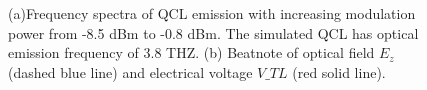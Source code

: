 \documentclass[11pt,final]{scrbook}
\begin{document}
\begin{figure}[htbp]
  \centering
\caption{(a)Frequency spectra of QCL emission with increasing modulation power from -8.5 dBm to -0.8 dBm. The simulated QCL has optical emission frequency of 3.8 THZ. (b) Beatnote of optical field $E_{z}$ (dashed blue line) and electrical voltage $V\_{TL}$ (red solid line).}
\label{fig:modA_Beatnote}
\end{figure}
\end{document}
